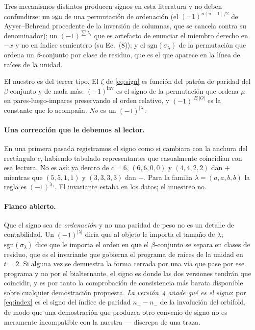 \documentclass[11pt,a4paper]{article}
\begin{document}
Tres mecanismos distintos producen signos en esta literatura y no deben confundirse: un
$\mathrm{sgn}$ de una permutaci\'on de ordenaci\'on (el $(-1)^{n(n-1)/2}$ de Ayyer--Behrend
procedente de la inversi\'on de columnas, que se cancela contra su denominador); un
$(-1)^{\sum\lambda_i}$ que es artefacto de enunciar el miembro derecho en $-x$ y no en \'indice
semientero (su Ec.~(8)); y el $\mathrm{sgn}(\sigma_\lambda)$ de la permutaci\'on que ordena un
$\beta$-conjunto por clase de residuo, que es el que aparece en la l\'inea de ra\'ices de la
unidad.

El nuestro es del tercer tipo. El $\zeta$ de \eqref{eq:sign} es funci\'on del patr\'on de
paridad del $\beta$-conjunto y de nada m\'as: $(-1)^{\mathrm{inv}}$ es el signo de la
permutaci\'on que ordena $\mu$ en pares-luego-impares preservando el orden relativo, y
$(-1)^{|E||O|}$ es la constante que lo acompa\~na. \emph{No} es un $(-1)^{|\lambda|}$.

\paragraph{Una correcci\'on que le debemos al lector.} En una primera pasada registramos el
signo como si cambiara con la anchura del rect\'angulo $c$, habiendo tabulado representantes
que casualmente coincid\'ian con esa lectura. No es as\'i: ya dentro de $c=6$, $(6,6,0,0)$ y
$(4,4,2,2)$ dan $+$ mientras que $(5,5,1,1)$ y $(3,3,3,3)$ dan $-$. Para la familia
$\lambda=(a,a,b,b)$ la regla es $(-1)^{\lambda_1}$. El invariante estaba en los datos; el
muestreo no.

\paragraph{Flanco abierto.} Que el signo sea de \emph{ordenaci\'on} y no una paridad de peso no
es un detalle de contabilidad. Un $(-1)^{|\lambda|}$ dir\'ia que al objeto le importa el
tama\~no de $\lambda$; $\mathrm{sgn}(\sigma_\lambda)$ dice que le importa el orden en que el
$\beta$-conjunto se separa en clases de residuo, que es el invariante que gobierna el programa
de ra\'ices de la unidad en $t=2$. Si alguna vez se demuestra la forma cerrada por una v\'ia
que pase por ese programa y no por el bialternante, el signo es donde las dos versiones
tendr\'an que coincidir, y es por tanto la comprobaci\'on de consistencia m\'as barata
disponible sobre cualquier demostraci\'on propuesta. \emph{La versi\'on~4 a\~nade qu\'e
\emph{es} el signo}: por \eqref{eq:index} es el signo del \'indice de paridad $n_+-n_-$ de la
involuci\'on del orbifold, de modo que una demostraci\'on que produzca otro convenio de signo no
es meramente incompatible con la nuestra --- discrepa de una traza.
\end{document}
